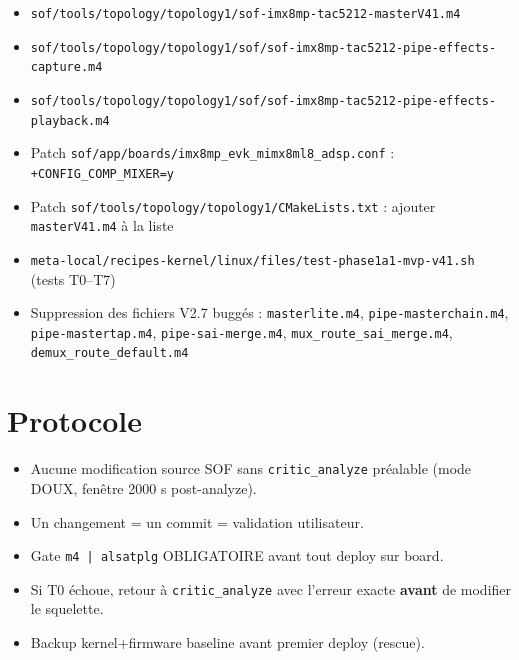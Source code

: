 \documentclass[11pt,a4paper]{article}
\begin{document}
\begin{itemize}[leftmargin=*, itemsep=1pt]
  \item \texttt{sof/tools/topology/topology1/sof-imx8mp-tac5212-masterV41.m4}
  \item \texttt{sof/tools/topology/topology1/sof/sof-imx8mp-tac5212-pipe-effects-capture.m4}
  \item \texttt{sof/tools/topology/topology1/sof/sof-imx8mp-tac5212-pipe-effects-playback.m4}
  \item Patch \texttt{sof/app/boards/imx8mp\_evk\_mimx8ml8\_adsp.conf} : \texttt{+CONFIG\_COMP\_MIXER=y}
  \item Patch \texttt{sof/tools/topology/topology1/CMakeLists.txt} : ajouter \texttt{masterV41.m4} à la liste
  \item \texttt{meta-local/recipes-kernel/linux/files/test-phase1a1-mvp-v41.sh} (tests T0--T7)
  \item Suppression des fichiers V2.7 buggés : \texttt{masterlite.m4}, \texttt{pipe-masterchain.m4}, \texttt{pipe-mastertap.m4}, \texttt{pipe-sai-merge.m4}, \texttt{mux\_route\_sai\_merge.m4}, \texttt{demux\_route\_default.m4}
\end{itemize}

\section{Protocole}

\begin{itemize}[leftmargin=*, itemsep=1pt]
  \item Aucune modification source SOF sans \texttt{critic\_analyze} préalable (mode DOUX, fenêtre 2000 s post-analyze).
  \item Un changement = un commit = validation utilisateur.
  \item Gate \texttt{m4 | alsatplg} OBLIGATOIRE avant tout deploy sur board.
  \item Si T0 échoue, retour à \texttt{critic\_analyze} avec l'erreur exacte \textbf{avant} de modifier le squelette.
  \item Backup kernel+firmware baseline avant premier deploy (rescue).
\end{itemize}
\end{document}
